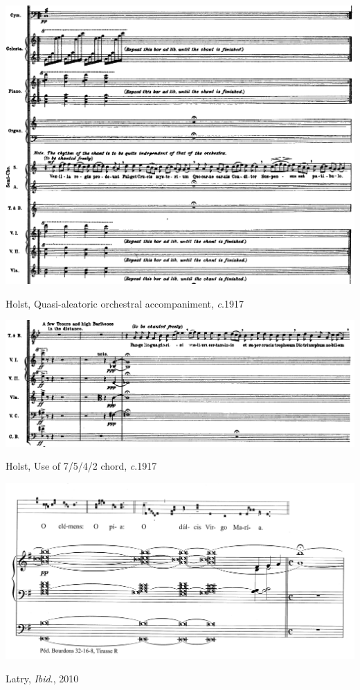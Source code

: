 \begin{example}
  \centering
  \includegraphics[width=\linewidth]{c/4/ex/holst_sop.png}
  \caption{Holst, Quasi-aleatoric orchestral accompaniment, \emph{c}.1917}
  \label{mus:holst_sop}
\end{example}

\vspace*{\fill}

\newpage

\vspace*{\fill}

\begin{example}
  \centering
  \includegraphics[width=\linewidth]{c/4/ex/holst_ten.png}
  \caption{Holst, Use of 7/5/4/2 chord, \emph{c}.1917}
  \label{mus:holst_ten}
\end{example}

\vspace*{\fill}

\begin{example}
  \centering
  \includegraphics[width=.9\linewidth]{c/6/ex/latry.png}
  \caption{Latry, \emph{Ibid}., 2010}
  \label{mus:latry}
\end{example}

